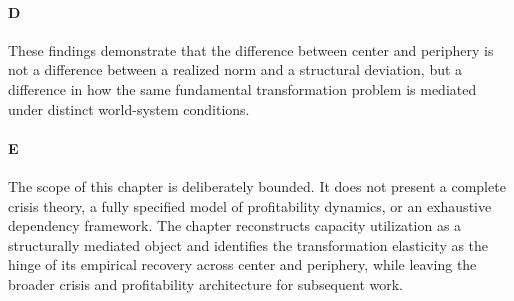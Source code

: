 \paragraph{D}
These findings demonstrate that the difference between center and periphery is not a difference between a realized norm and a structural deviation, but a difference in how the same fundamental transformation problem is mediated under distinct world-system conditions.

\paragraph{E}
The scope of this chapter is deliberately bounded. It does not present a complete crisis theory, a fully specified model of profitability dynamics, or an exhaustive dependency framework. The chapter reconstructs capacity utilization as a structurally mediated object and identifies the transformation elasticity as the hinge of its empirical recovery across center and periphery, while leaving the broader crisis and profitability architecture for subsequent work.